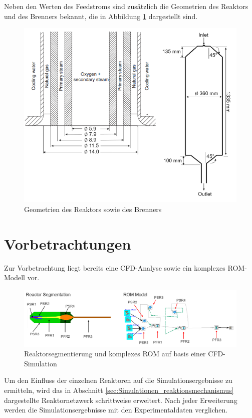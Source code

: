         Neben den Werten des Feedstroms sind zusätzlich die Geometrien des Reaktors und des Brenners bekannt, die in Abbildung \ref{fig:reaktorgeometrie} dargestellt sind. 
        \begin{figure}[H]
            \centering
            \includegraphics[width=0.8\linewidth]{img/sonstiges/Reaktorgeometrien.png}
            \caption{Geometrien des Reaktors sowie des Brenners}
            \label{fig:reaktorgeometrie}
        \end{figure}
    \section{Vorbetrachtungen}
        Zur Vorbetrachtung liegt bereits eine CFD-Analyse sowie ein komplexes ROM-Modell vor. 
        \begin{figure}[H]
            \centering
            \includegraphics[width=1\linewidth]{img/sonstiges/Reactor Segmentation.png}
            \caption{Reaktorsegmentierung und komplexes ROM auf basis einer CFD-Simulation \cite{gonzales}}
            \label{fig:reaktorsegmentierung}
        \end{figure}
        Um den Einfluss der einzelnen Reaktoren auf die Simulationsergebnisse zu ermitteln, wird das in Abschnitt \ref{sec:Simulationen_reaktionsmechanismus} dargestellte Reaktornetzwerk schrittweise erweitert. Nach jeder Erweiterung werden die Simulationsergebnisse mit den Experimentaldaten verglichen. 

